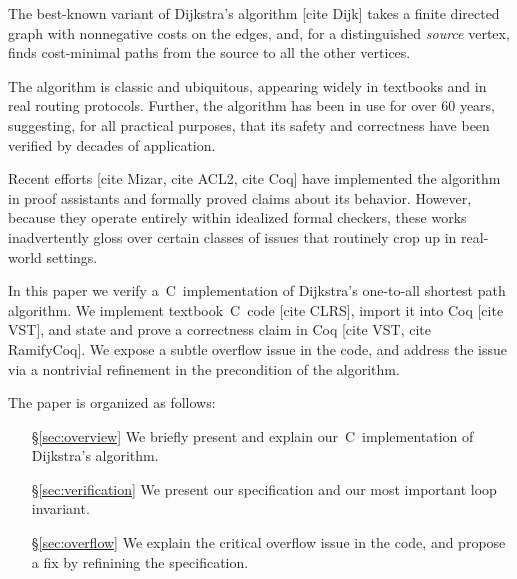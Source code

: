 
The best-known variant of Dijkstra's algorithm [cite Dijk] 
takes a finite directed graph with nonnegative costs 
on the edges, and, for a distinguished \emph{source} vertex, 
finds cost-minimal paths from the source to all the other vertices.

The algorithm is classic and ubiquitous, appearing widely in textbooks
and in real routing protocols. Further, the algorithm has been in 
use for over $60$ years, suggesting, for all practical purposes, 
that its safety and correctness have been verified by decades of application. 

Recent efforts [cite Mizar, cite ACL2, cite Coq] have implemented the algorithm 
in proof assistants and formally proved claims about its behavior.
However, because they operate entirely within idealized formal checkers, 
these works inadvertently gloss over certain classes of issues 
that routinely crop up in real-world settings.

In this paper we verify a~C~implementation of Dijkstra's 
one-to-all shortest path algorithm. We implement 
textbook~C~code [cite CLRS], import it into Coq [cite VST],
and state and prove a correctness claim in Coq [cite VST, cite RamifyCoq].
We expose a subtle overflow issue in the code, and address the issue
via a nontrivial refinement in the precondition of the algorithm.

The paper is organized as follows:
\vspace{-1em}
\begin{itemize}
    \item[\S\ref{sec:overview}] We briefly present and explain 
    our~C~implementation of Dijkstra's algorithm.
    \item[\S\ref{sec:verification}] We present our specification 
    and our most important loop invariant.
    \item[\S\ref{sec:overflow}] We explain the critical overflow issue
    in the code, and propose a fix by refinining the specification.
\end{itemize}